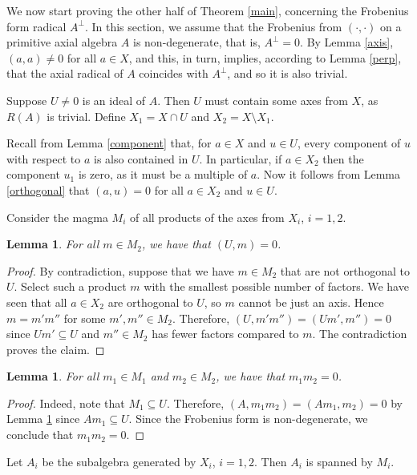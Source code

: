 \documentclass[12pt]{article}
\newtheorem{lemma}[theorem]{Lemma}
\begin{document}
We now start proving the other half of Theorem \ref{main}, concerning the Frobenius 
form radical $A^\perp$. In this section, we assume that the Frobenius from 
$(\cdot,\cdot)$ on a primitive axial algebra $A$ is non-degenerate, that is, 
$A^\perp=0$. By Lemma \ref{axis}, $(a,a)\neq 0$ for all $a\in X$, and this, in turn, 
implies, according to Lemma \ref{perp}, that the axial radical of $A$ coincides with 
$A^\perp$, and so it is also trivial. 

Suppose $U\neq 0$ is an ideal of $A$. Then $U$ must contain some axes from $X$, as 
$R(A)$ is trivial. Define $X_1=X\cap U$ and $X_2=X\setminus X_1$.

Recall from Lemma \ref{component} that, for $a\in X$ and $u\in U$, every component of 
$u$ with respect to $a$ is also contained in $U$. In particular, if $a\in X_2$ then 
the component $u_1$ is zero, as it must be a multiple of $a$. Now it follows from 
Lemma \ref{orthogonal} that $(a,u)=0$ for all $a\in X_2$ and $u\in U$.

Consider the magma $M_i$ of all products of the axes from $X_i$, $i=1,2$. 

\begin{lemma} \label{orthogonal to ideal}
For all $m\in M_2$, we have that $(U,m)=0$.
\end{lemma}

\begin{proof}
By contradiction, suppose that we have $m\in M_2$ that are not orthogonal to $U$. 
Select such a product $m$ with the smallest possible number of factors. We have seen 
that all $a\in X_2$ are orthogonal to $U$, so $m$ cannot be just an axis. Hence 
$m=m'm''$ for some $m',m''\in M_2$. Therefore, $(U,m'm'')=(Um',m'')=0$ since 
$Um'\subseteq U$ and $m''\in M_2$ has fewer factors compared to $m$. The 
contradiction proves the claim.
\end{proof}

\begin{lemma} \label{product zero}
For all $m_1\in M_1$ and $m_2\in M_2$, we have that $m_1m_2=0$.
\end{lemma}

\begin{proof}
Indeed, note that $M_1\subseteq U$. Therefore, $(A,m_1m_2)=(Am_1,m_2)=0$ by Lemma 
\ref{orthogonal to ideal} since $Am_1\subseteq U$. Since the Frobenius form is 
non-degenerate, we conclude that $m_1m_2=0$.
\end{proof}

Let $A_i$ be the subalgebra generated by $X_i$, $i=1,2$. Then $A_i$ is spanned by 
$M_i$. 
\end{document}
